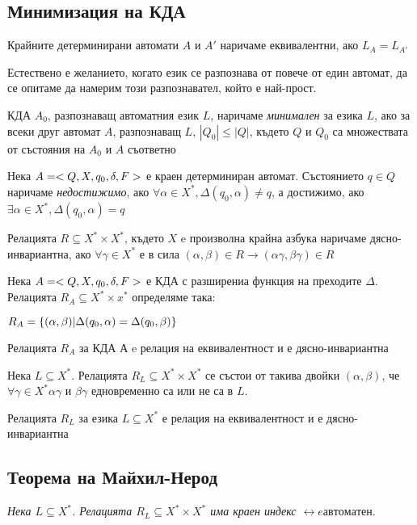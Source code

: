 \documentclass[11pt]{article} %
\begin{document}
\subsection{Минимизация на КДА}
 Крайните детерминирани автомати $A$ и $A'$ наричаме еквивалентни, ако $L_{A} = L_{A'}$ \par

Естествено е желанието, когато език се разпознава от повече от един автомат, да се опитаме да намерим този разпознавател, който е най-прост. \par

 КДА $A_{0}$, разпознаващ автоматния език $L$, наричаме \emph{минимален} за езика $L$, ако за всеки друг автомат $A$, разпознаващ $L$, $|Q_{0}| \leq |Q|$, където $Q$ и $Q_{0}$ са множествата от състояния на $A_{0}$ и $A$ съответно \par

 Нека $A = <Q, X, q_{0}, \delta, F>$ е краен детерминиран автомат. Състоянието $q \in Q$ наричаме \emph{недостижимо}, ако 
$\forall \alpha \in X^{*}, \Delta (q_{0}, \alpha) \neq q$, а достижимо, ако $\exists \alpha \in X^{*}, \Delta(q_{0}, \alpha) = q$

 Релацията $R \subseteq X^{*} \times X^{*}$, където $X$ e произволна крайна азбука наричаме дясно-инвариантна, ако $\forall \gamma \in X^{*}$ е в сила $(\alpha, \beta) \in R \rightarrow (\alpha \gamma, \beta \gamma) \in R$

 Нека $A = <Q, X, q_{0}, \delta, F>$ е КДА с разширениа функция на преходите $\Delta$. Релацията $R_{A} \subseteq X^{*} \times x^{*}$ определяме така: \\

\centerline{$R_{A} = \{(\alpha, \beta)|\Delta(q_{0}, \alpha) = \Delta(q_{0}, \beta)\}$} 

\lemma Релацията $R_{A}$ за КДА $А$ e релация на еквивалентност и е дясно-инвариантна

 Нека $L \subseteq X^{*}$. Релацията $R_{L} \subseteq X^{*} \times X^{*}$ се състои от такива двойки $(\alpha, \beta)$, че $\forall \gamma \in X^{*} \alpha \gamma$ и $\beta \gamma$ едновременно са или не са в $L$.

\lemma Релацията $R_{L}$ за езика $L \subseteq X^{*}$ е релация на еквивалентност и е дясно-инвариантна

\subsection{Теорема на Майхил-Нерод}
\emph{Нека $L \subseteq X^{*}$. Релацията $R_{L} \subseteq X^{*} \times X^{*}$ има краен индекс $\leftrightarrow e автоматен$}.
\end{document}
